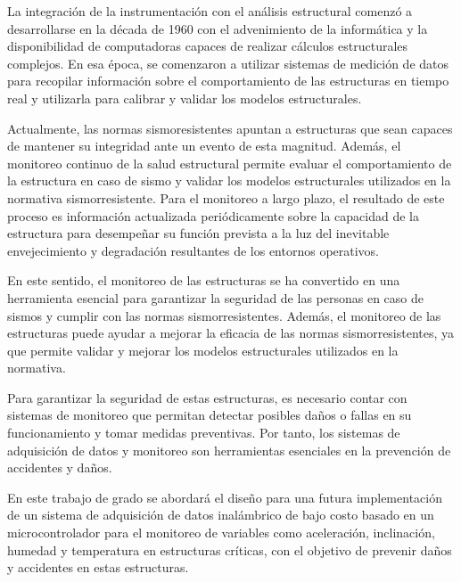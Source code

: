 \documentclass[12pt,letterpaper]{article}
\begin{document}
La integración de la instrumentación con el análisis estructural comenzó a desarrollarse en la década de 1960 con el advenimiento de la informática y la disponibilidad de computadoras capaces de realizar cálculos estructurales complejos. En esa época, se comenzaron a utilizar sistemas de medición de datos para recopilar información sobre el comportamiento de las estructuras en tiempo real y utilizarla para calibrar y validar los modelos estructurales.

Actualmente, las normas sismoresistentes apuntan a estructuras que sean capaces de mantener su integridad ante un evento de esta magnitud. Además, el monitoreo continuo de la salud estructural permite evaluar el comportamiento de la estructura en caso de sismo y validar los modelos estructurales utilizados en la normativa sismorresistente. Para el monitoreo a largo plazo, el resultado de este proceso es información actualizada periódicamente sobre la capacidad de la estructura para desempeñar su función prevista a la luz del inevitable envejecimiento y degradación resultantes de los entornos operativos.


En este sentido, el monitoreo de las estructuras se ha convertido en una herramienta esencial para garantizar la seguridad de las personas en caso de sismos y cumplir con las normas sismorresistentes. Además, el monitoreo de las estructuras puede ayudar a mejorar la eficacia de las normas sismorresistentes, ya que permite validar y mejorar los modelos estructurales utilizados en la normativa.

Para garantizar la seguridad de estas estructuras, es necesario contar con sistemas de monitoreo que permitan detectar posibles daños o fallas en su funcionamiento y tomar medidas preventivas. Por tanto, los sistemas de adquisición de datos y monitoreo son herramientas esenciales en la prevención de accidentes y daños.

En este trabajo de grado se abordará el diseño para una futura implementación de un sistema de adquisición de datos inalámbrico de bajo costo basado en un microcontrolador para el monitoreo de variables como aceleración, inclinación, humedad y temperatura en estructuras críticas, con el objetivo de prevenir daños y accidentes en estas estructuras.


\end{document}
